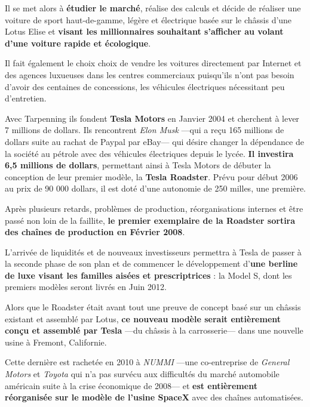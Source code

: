 Il se met alors à \textbf{étudier le marché}, réalise des calculs et décide de réaliser une voiture de sport haut-de-gamme, légère et électrique basée sur le châssis d'une Lotus Elise et \textbf{visant les millionnaires souhaitant s'afficher au volant d'une voiture rapide et écologique}.

Il fait également le choix choix de vendre les voitures directement par Internet et des agences luxueuses dans les centres commerciaux puisqu'ils n'ont pas besoin d'avoir des centaines de concessions, les véhicules électriques nécessitant peu d'entretien.

\vspace{5mm}

Avec Tarpenning ils fondent \textbf{Tesla Motors} en Janvier 2004 et cherchent à lever 7 millions de dollars. Ils rencontrent \textit{Elon Musk} ---qui a reçu 165 millions de dollars suite au rachat de Paypal par eBay--- qui désire changer la dépendance de la société au pétrole avec des véhicules électriques depuis le lycée. \textbf{Il investira 6,5 millions de dollars}, permettant ainsi à Tesla Motors de débuter la conception de leur premier modèle, la \textbf{Tesla Roadster}. Prévu pour début 2006 au prix de 90 000 dollars, il est doté d'une autonomie de 250 milles, une première.

Après plusieurs retards, problèmes de production, réorganisations internes et être passé non loin de la faillite, \textbf{le premier exemplaire de la Roadster sortira des chaînes de production en Février 2008}.

\vspace{5mm}

L'arrivée de liquidités et de nouveaux investisseurs permettra à Tesla de passer à la seconde phase de son plan\supercite{TeslaSecretMasterPlan} et de commencer le développement d'\textbf{une berline de luxe visant les familles aisées et prescriptrices} : la Model S, dont les premiers modèles seront livrés en Juin 2012.

Alors que le Roadster était avant tout une preuve de concept basé sur un châssis existant et assemblé par Lotus\supercite{LotusPosition}, \textbf{ce nouveau modèle serait entièrement conçu et assemblé par Tesla} ---du châssis à la carrosserie--- dans une nouvelle usine à Fremont, Californie.

Cette dernière est rachetée en 2010 à \textit{NUMMI} ---une co-entreprise de \textit{General Motors} et \textit{Toyota} qui n'a pas survécu aux difficultés du marché automobile américain suite à la crise économique de 2008--- et \textbf{est entièrement réorganisée sur le modèle de l'usine SpaceX} avec des chaînes automatisées.


